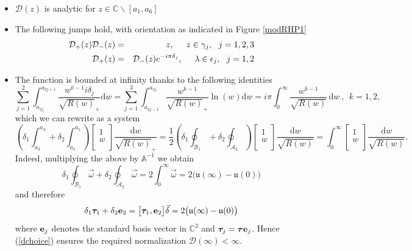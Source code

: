 \documentclass[10pt,oneside,reqno]{amsart}
\numberwithin{equation}{section}
\renewcommand{\d}{{\mathrm d}}
\def\eqref#1{(\ref{#1})}
\begin{document}
\begin{itemize}
 \item $\mathcal{D}(z)$ is analytic for $z\in\mathbb{C}\backslash[a_1,a_6]$
  \item The following jumps hold, with orientation as indicated in Figure \ref{modRHP1}
\begin{eqnarray*}
  \mathcal{D}_+(z)\mathcal{D}_-(z) &=& z,\hspace{0.5cm}z\in\gamma_j,\ \ j=1,2,3\\
  \mathcal{D}_+(z)&=&\mathcal{D}_-(z)e^{-i\pi\delta_j},\hspace{0.5cm}\lambda\in \epsilon_j,\ \ j=1,2
\end{eqnarray*}
  \item The function is bounded at infinity 
  thanks to the following identities 
  \begin{equation*}
  \sum_{j=1}^2\int_{a_{2j}}^{a_{2j+1}}\frac{w^{k-1}i\delta_j}{\sqrt{R(w)}_+}\d w = \sum_{j=1}^3\int_{a_{2j-1}}^{a_{2j}}\frac{w^{k-1}}{\sqrt{R(w)}_+}
  \ln(w)\d w = i\pi \int_0^{\infty}\frac{w^{k-1}}{\sqrt{R(w)}}\,\d w\ ,\ \ k=1,2,
\end{equation*} 
which we can rewrite as a system
\begin{equation*}
  \left(\delta_1\int_{a_2}^{a_3}+\delta_2\int_{a_4}^{a_5}\right)\begin{bmatrix}
                                                               1\\
w\\
                                                              \end{bmatrix}\frac{\d w}{\sqrt{R(w)}_+} = 
\frac{1}{2}\left(\delta_1\oint_{\mathcal{B}_1}+\delta_2\oint_{\mathcal{A}_2}\right)\begin{bmatrix}
                                                                                    1\\
w\\
                                                                                   \end{bmatrix}\frac{\d w}{\sqrt{R(w)}}
=\int_0^{\infty}\begin{bmatrix}
                 1\\
w\\
                \end{bmatrix}\frac{\d w}{\sqrt{R(w)}}.
\end{equation*}
Indeed, multiplying the above by $\mathbb A^{-1}$  we obtain
\begin{equation*}
 \delta_1\oint_{\mathcal{B}_1}\vec{\omega}+\delta_2\oint_{\mathcal{A}_2}\vec{\omega}=2\int_0^{\infty}\vec{\omega} = 2\big(\mathfrak{u}(\infty)-\mathfrak{u}(0)\big)
\end{equation*}
and therefore 
\begin{equation}
  \delta_1{\boldsymbol \tau}_1+\delta_2{\bf e}_2 = \big[{\boldsymbol \tau}_1,{\bf e}_2\big]\vec{\delta} = 2\big(\mathfrak{u}(\infty)-\mathfrak{u}(0)\big)
  \label{deltabel}
\end{equation}
where ${\bf e}_j$ denotes the standard basis vector in $\mathbb{C}^2$ and $\boldsymbol \tau_j=\boldsymbol \tau{\bf e}_j$. Hence \eqref{dchoice} ensures the 
required normalization $\mathcal{D}(\infty)<\infty$.
\end{itemize}
\end{document}
